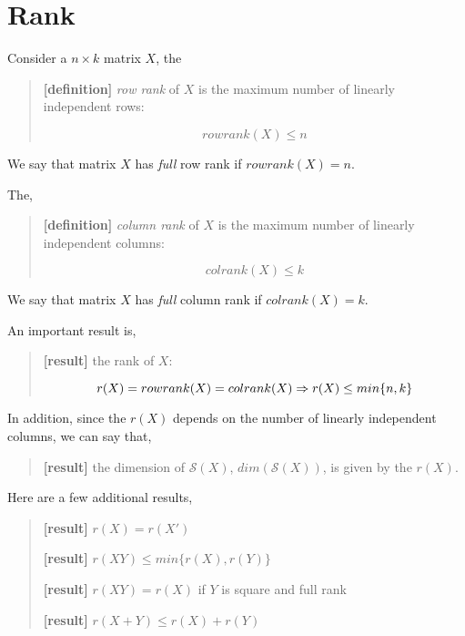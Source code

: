 \documentclass[
  letterpaper,
  DIV=11,
  numbers=noendperiod]{scrreprt}
\begin{document}
\hypertarget{rank}{%
\section{Rank}\label{rank}}

Consider a \(n\times k\) matrix \(X\), the

\begin{quote}
\textbf{{[}definition{]}} \emph{row rank} of \(X\) is the maximum number
of linearly independent rows:

\[
rowrank(X) \leq n
\]
\end{quote}

We say that matrix \(X\) has \emph{full} row rank if \(rowrank(X)=n\).

The,

\begin{quote}
\textbf{{[}definition{]}} \emph{column rank} of \(X\) is the maximum
number of linearly independent columns:

\[
colrank(X) \leq k
\]
\end{quote}

We say that matrix \(X\) has \emph{full} column rank if
\(colrank(X)=k\).

An important result is,

\begin{quote}
\textbf{{[}result{]}} the rank of \(X\):

\[
r(X) = rowrank(X)=colrank(X) \\
\Rightarrow r(X)\leq min\{n,k\}
\]
\end{quote}

In addition, since the \(r(X)\) depends on the number of linearly
independent columns, we can say that,

\begin{quote}
\textbf{{[}result{]}} the dimension of \(\mathcal{S}(X)\),
\(dim(\mathcal{S}(X))\), is given by the \(r(X)\).
\end{quote}

Here are a few additional results,

\begin{quote}
\textbf{{[}result{]}} \(r(X)=r(X')\)

\textbf{{[}result{]}} \(r(XY)\leq min\{r(X),r(Y)\}\)

\textbf{{[}result{]}} \(r(XY)=r(X)\) if \(Y\) is square and full rank

\textbf{{[}result{]}} \(r(X+Y)\leq r(X) + r(Y)\)
\end{quote}
\end{document}
